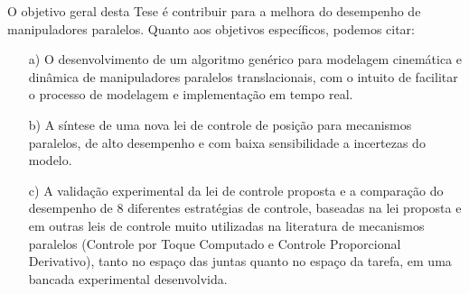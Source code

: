 \documentclass[]{politex}
\begin{document}
O objetivo geral desta Tese é contribuir para a melhora do desempenho de manipuladores paralelos. Quanto aos objetivos específicos, podemos citar:

\begin{itemize}
\item[a)] O desenvolvimento de um algoritmo genérico para modelagem cinemática e dinâmica de manipuladores paralelos translacionais, com o intuito de facilitar o processo de modelagem e implementação em tempo real.
\item[b)] A síntese de uma nova lei de controle de posição para mecanismos paralelos, de alto desempenho e com baixa sensibilidade a incertezas do modelo.
\item[c)] A validação experimental da lei de controle proposta e a comparação do desempenho de 8 diferentes estratégias de controle, baseadas na lei proposta e em outras leis de controle muito utilizadas na literatura de mecanismos paralelos (Controle por Toque Computado e Controle Proporcional Derivativo), tanto no espaço das juntas quanto no espaço da tarefa, em uma bancada experimental desenvolvida.
\end{itemize}








\end{document}
